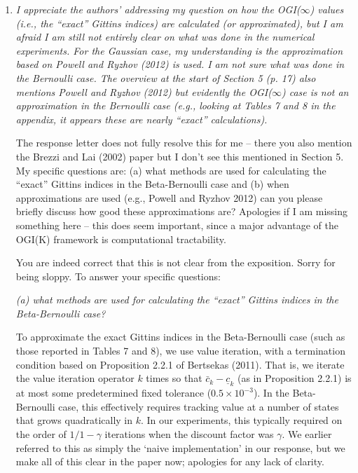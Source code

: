 \documentclass[11pt]{article}
\newcommand{\1}{\ensuremath{\mathbf{1}}} %
\theoremstyle{thm-sf}
\begin{document}
	\begin{enumerate}
		
		\item {\it I appreciate the authors’ addressing my question on how the OGI($\infty$) values (i.e., the “exact” Gittins indices) are calculated (or approximated), but I am afraid I am still not entirely clear on what was done in the numerical experiments. For the Gaussian case, my understanding is the approximation based on Powell and Ryzhov (2012) is used. I am not sure what was done in the Bernoulli case. The overview at the start of Section 5 (p. 17) also mentions Powell and Ryzhov (2012) but evidently the OGI($\infty$) case is not an approximation in the Bernoulli case (e.g., looking at Tables 7 and 8 in the appendix, it appears these are nearly “exact” calculations).
			
		The response letter does not fully resolve this for me – there you also mention the Brezzi and Lai (2002) paper but I don’t see this mentioned in Section 5. My specific questions are: (a) what methods are used for calculating the “exact” Gittins indices in the Beta-Bernoulli case and (b) when approximations are used (e.g., Powell and Ryzhov 2012) can you please briefly discuss how good these approximations are?
		Apologies if I am missing something here – this does seem important, since a major advantage of the OGI(K) framework is computational tractability.
		}

You are indeed correct that this is not clear from the exposition. Sorry for being sloppy. To answer your specific questions: 

{\em (a) what methods are used for calculating the “exact” Gittins indices in the Beta-Bernoulli case?} 

To approximate the exact Gittins indices in the Beta-Bernoulli case (such as those reported in Tables 7 and 8), we use value iteration, with a termination condition based on Proposition 2.2.1 of Bertsekas (2011). That is, we iterate the value iteration operator $k$ times so that $\bar{c}_k - \underline{c}_k$ (as in Proposition 2.2.1) is at most some predetermined fixed tolerance ($0.5 \times 10^{-3}$). In the Beta-Bernoulli case, this effectively requires tracking value at a number of states that grows quadratically in $k$. In our experiments, this typically required on the order of $1/1-\gamma$ iterations when the discount factor was $\gamma$. We earlier referred to this as simply the `naive implementation' in our response, but we make all of this clear in the paper now; apologies for any lack of clarity. 


\end{enumerate}
\end{document}
